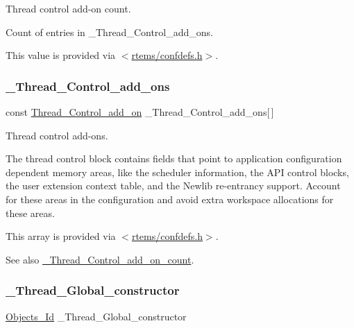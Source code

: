 Thread control add-\/on count. 

Count of entries in \+\_\+\+Thread\+\_\+\+Control\+\_\+add\+\_\+ons.

This value is provided via $<$\mbox{\hyperlink{confdefs_8h}{rtems/confdefs.\+h}}$>$. \mbox{\label{group__RTEMSScoreThread_ga60a80015d5ec442d6e0f42c1c7969d0a}} 
\subsubsection{\texorpdfstring{\_Thread\_Control\_add\_ons}{\_Thread\_Control\_add\_ons}}
{\footnotesize\ttfamily const \mbox{\hyperlink{structThread__Control__add__on}{Thread\+\_\+\+Control\+\_\+add\+\_\+on}} \+\_\+\+Thread\+\_\+\+Control\+\_\+add\+\_\+ons\mbox{[}$\,$\mbox{]}}



Thread control add-\/ons. 

The thread control block contains fields that point to application configuration dependent memory areas, like the scheduler information, the A\+PI control blocks, the user extension context table, and the Newlib re-\/entrancy support. Account for these areas in the configuration and avoid extra workspace allocations for these areas.

This array is provided via $<$\mbox{\hyperlink{confdefs_8h}{rtems/confdefs.\+h}}$>$.

\begin{DoxySeeAlso}{See also}
\mbox{\hyperlink{group__RTEMSScoreThread_ga93f9a4600ed05daba5da3a8111393fbb}{\+\_\+\+Thread\+\_\+\+Control\+\_\+add\+\_\+on\+\_\+count}}. 
\end{DoxySeeAlso}
\mbox{\label{group__RTEMSScoreThread_ga547b3e17ad8dc24bd9e8385a89479174}} 
\subsubsection{\texorpdfstring{\_Thread\_Global\_constructor}{\_Thread\_Global\_constructor}}
{\footnotesize\ttfamily \mbox{\hyperlink{group__RTEMSScoreObject_ga5821f52a51072941bdd603e542d0863e}{Objects\+\_\+\+Id}} \+\_\+\+Thread\+\_\+\+Global\+\_\+constructor}



